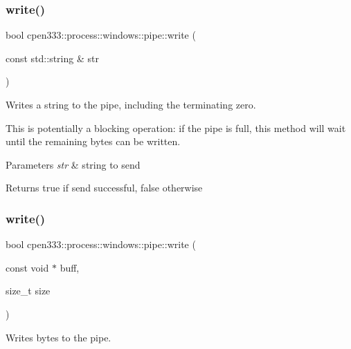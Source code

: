 \subsubsection{\texorpdfstring{write()}{write()}\hspace{0.1cm}{\footnotesize\ttfamily [1/2]}}
{\footnotesize\ttfamily bool cpen333\+::process\+::windows\+::pipe\+::write (\begin{DoxyParamCaption}\item[{const std\+::string \&}]{str }\end{DoxyParamCaption})\hspace{0.3cm}{\ttfamily [inline]}}



Writes a string to the pipe, including the terminating zero. 

This is potentially a blocking operation\+: if the pipe is full, this method will wait until the remaining bytes can be written.


\begin{DoxyParams}{Parameters}
{\em str} & string to send \\
\hline
\end{DoxyParams}
\begin{DoxyReturn}{Returns}
true if send successful, false otherwise 
\end{DoxyReturn}
\mbox{\label{classcpen333_1_1process_1_1windows_1_1pipe_a072e8bded1b6f0a45683875ed3be1aa2}} 
\subsubsection{\texorpdfstring{write()}{write()}\hspace{0.1cm}{\footnotesize\ttfamily [2/2]}}
{\footnotesize\ttfamily bool cpen333\+::process\+::windows\+::pipe\+::write (\begin{DoxyParamCaption}\item[{const void $\ast$}]{buff,  }\item[{size\+\_\+t}]{size }\end{DoxyParamCaption})\hspace{0.3cm}{\ttfamily [inline]}}



Writes bytes to the pipe. 

